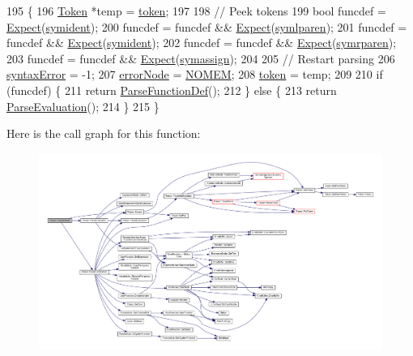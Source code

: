 \begin{DoxyCode}
195 \{
196     \hyperlink{structToken}{Token} *temp = \hyperlink{classParser_a467028559d31c5b33f16ca8be56715cc}{token};
197 
198     \textcolor{comment}{// Peek tokens}
199     \textcolor{keywordtype}{bool} funcdef = \hyperlink{classParser_a811765334b0cd3f01152c35c9f5bcaec}{Expect}(\hyperlink{lex_8h_a7feef761cd73fac6e25b8bb80d2c4e54ade7694e5efc9616383548e57122faea5}{symident});
200     funcdef = funcdef && \hyperlink{classParser_a811765334b0cd3f01152c35c9f5bcaec}{Expect}(\hyperlink{lex_8h_a7feef761cd73fac6e25b8bb80d2c4e54ad92b5471ad4a0b9fc95faae6ca2172ad}{symlparen});
201     funcdef = funcdef && \hyperlink{classParser_a811765334b0cd3f01152c35c9f5bcaec}{Expect}(\hyperlink{lex_8h_a7feef761cd73fac6e25b8bb80d2c4e54ade7694e5efc9616383548e57122faea5}{symident});
202     funcdef = funcdef && \hyperlink{classParser_a811765334b0cd3f01152c35c9f5bcaec}{Expect}(\hyperlink{lex_8h_a7feef761cd73fac6e25b8bb80d2c4e54a59c8837a9f31298813b4703cefbd185e}{symrparen});
203     funcdef = funcdef && \hyperlink{classParser_a811765334b0cd3f01152c35c9f5bcaec}{Expect}(\hyperlink{lex_8h_a7feef761cd73fac6e25b8bb80d2c4e54a648933f05e3bcba968a27d425933784d}{symassign});
204 
205     \textcolor{comment}{// Restart parsing}
206     \hyperlink{classParser_ae50a199b804c9f5e8342a4d0a1ae6a95}{syntaxError} = -1;
207     \hyperlink{classParser_ab482ff79113ad2f1ef60bc6dd18528d1}{errorNode} = \hyperlink{platform_8h_a46ff2bfbf0d44b8466a2251d5bd5e6f8}{NOMEM};
208     \hyperlink{classParser_a467028559d31c5b33f16ca8be56715cc}{token} = temp;
209 
210     \textcolor{keywordflow}{if} (funcdef) \{
211         \textcolor{keywordflow}{return} \hyperlink{classParser_a0e8b1f794af2b9923bc3fcb7498004f9}{ParseFunctionDef}();
212     \} \textcolor{keywordflow}{else} \{
213         \textcolor{keywordflow}{return} \hyperlink{classParser_a19c5b6055d066d21ad39a32287e833c2}{ParseEvaluation}();
214     \}
215 \}
\end{DoxyCode}


Here is the call graph for this function\+:
\nopagebreak
\begin{figure}[H]
\begin{center}
\leavevmode
\includegraphics[width=350pt]{d0/d40/classParser_aca8329fb5ee4812398144fd1d647fe39_cgraph}
\end{center}
\end{figure}




